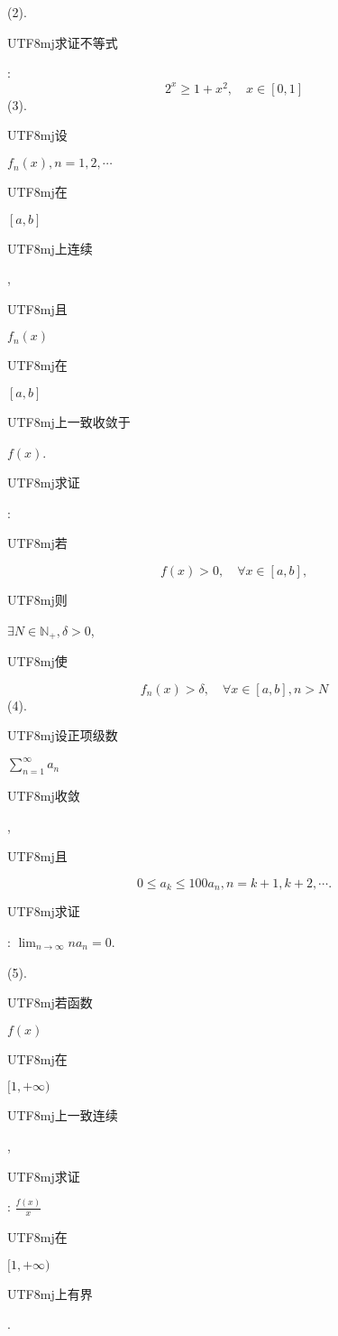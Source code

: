 \documentclass[10pt]{article}
\begin{document}
(2). \begin{CJK}{UTF8}{mj}求证不等式\end{CJK}:
$$
2^{x} \geqslant 1+x^{2}, \quad x \in[0,1]
$$
(3). \begin{CJK}{UTF8}{mj}设\end{CJK} $f_{n}(x), n=1,2, \cdots$ \begin{CJK}{UTF8}{mj}在\end{CJK} $[a, b]$ \begin{CJK}{UTF8}{mj}上连续\end{CJK}, \begin{CJK}{UTF8}{mj}且\end{CJK} $f_{n}(x)$ \begin{CJK}{UTF8}{mj}在\end{CJK} $[a, b]$ \begin{CJK}{UTF8}{mj}上一致收敛于\end{CJK} $f(x)$. \begin{CJK}{UTF8}{mj}求证\end{CJK}: \begin{CJK}{UTF8}{mj}若\end{CJK}
$$
f(x)>0, \quad \forall x \in[a, b],
$$
\begin{CJK}{UTF8}{mj}则\end{CJK} $\exists N \in \mathbb{N}_{+}, \delta>0$, \begin{CJK}{UTF8}{mj}使\end{CJK}
$$
f_{n}(x)>\delta, \quad \forall x \in[a, b], n>N
$$
(4). \begin{CJK}{UTF8}{mj}设正项级数\end{CJK} $\sum_{n=1}^{\infty} a_{n}$ \begin{CJK}{UTF8}{mj}收敛\end{CJK}, \begin{CJK}{UTF8}{mj}且\end{CJK}
$$
0 \leqslant a_{k} \leqslant 100 a_{n}, n=k+1, k+2, \cdots .
$$
\begin{CJK}{UTF8}{mj}求证\end{CJK}: $\lim _{n \rightarrow \infty} n a_{n}=0$.

(5). \begin{CJK}{UTF8}{mj}若函数\end{CJK} $f(x)$ \begin{CJK}{UTF8}{mj}在\end{CJK} $[1,+\infty)$ \begin{CJK}{UTF8}{mj}上一致连续\end{CJK}, \begin{CJK}{UTF8}{mj}求证\end{CJK}: $\frac{f(x)}{x}$ \begin{CJK}{UTF8}{mj}在\end{CJK} $[1,+\infty)$ \begin{CJK}{UTF8}{mj}上有界\end{CJK}.
\end{document}
